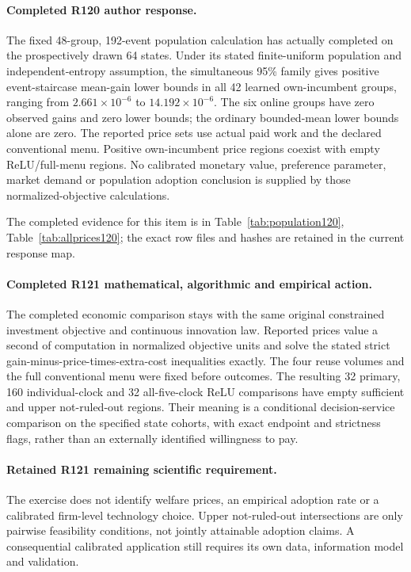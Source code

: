 \paragraph{Completed R120 author response.}
The fixed 48-group, 192-event population calculation has actually completed on the prospectively drawn 64 states. Under its stated finite-uniform population and independent-entropy assumption, the simultaneous 95\% family gives positive event-staircase mean-gain lower bounds in all 42 learned own-incumbent groups, ranging from $2.661\times10^{-6}$ to $14.192\times10^{-6}$. The six online groups have zero observed gains and zero lower bounds; the ordinary bounded-mean lower bounds alone are zero. The reported price sets use actual paid work and the declared conventional menu. Positive own-incumbent price regions coexist with empty ReLU/full-menu regions. No calibrated monetary value, preference parameter, market demand or population adoption conclusion is supplied by those normalized-objective calculations.

The completed evidence for this item is in Table~\ref{tab:population120}, Table~\ref{tab:allprices120}; the exact row files and hashes are retained in the current response map.

\paragraph{Completed R121 mathematical, algorithmic and empirical action.}
The completed economic comparison stays with the same original constrained investment objective and continuous innovation law. Reported prices value a second of computation in normalized objective units and solve the stated strict gain-minus-price-times-extra-cost inequalities exactly. The four reuse volumes and the full conventional menu were fixed before outcomes. The resulting 32 primary, 160 individual-clock and 32 all-five-clock ReLU comparisons have empty sufficient and upper not-ruled-out regions. Their meaning is a conditional decision-service comparison on the specified state cohorts, with exact endpoint and strictness flags, rather than an externally identified willingness to pay.

\paragraph{Retained R121 remaining scientific requirement.}
The exercise does not identify welfare prices, an empirical adoption rate or a calibrated firm-level technology choice. Upper not-ruled-out intersections are only pairwise feasibility conditions, not jointly attainable adoption claims. A consequential calibrated application still requires its own data, information model and validation.

